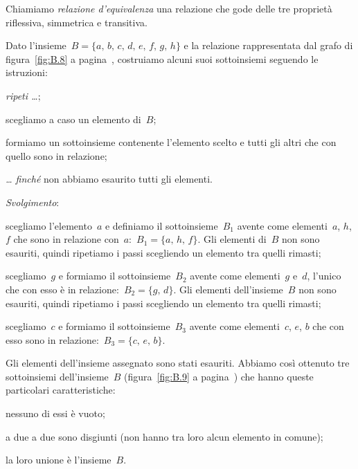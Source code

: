 \begin{definizione}
Chiamiamo \emph{relazione d'equivalenza} una relazione che gode delle tre proprietà riflessiva, simmetrica e transitiva.
\end{definizione}

\ovalbox{\risolvii \ref{ese:B.30}, \ref{ese:B.31}}

\begin{exrig}
 \begin{esempio}

Dato l'insieme~$B = \{a\text{, }b\text{, }c\text{, }d\text{, }e\text{, }f\text{, }g\text{, }h\}$ e la relazione rappresentata dal grafo di figura~\ref{fig:B.8} a pagina~\pageref{fig:B.8}, costruiamo alcuni suoi sottoinsiemi seguendo le istruzioni:
\begin{itemize*}
\item \emph{ripeti \ldots{}};
\item scegliamo a caso un elemento di~$B$;
\item formiamo un sottoinsieme contenente l'elemento scelto e tutti gli altri che con quello sono in relazione;
\item \emph{\ldots{} finché} non abbiamo esaurito tutti gli elementi.
\end{itemize*}


\emph{Svolgimento}:
\begin{itemize*}
\item scegliamo l'elemento~$a$ e definiamo il sottoinsieme~$B_1$ avente come elementi~$a$, $h$, $f$ che sono in relazione con~$a$:~$B_1 = \{a\text{, }h\text{, }f\}$.
Gli elementi di~$B$ non sono esauriti, quindi ripetiamo i passi scegliendo un elemento tra quelli rimasti;
\item scegliamo~$g$ e formiamo il sottoinsieme~$B_2$ avente come elementi~$g$ e~$d$, l'unico che con esso è in relazione:~$B_2 = \{g\text{, }d\}$.
Gli elementi dell'insieme~$B$ non sono esauriti, quindi ripetiamo i passi scegliendo un elemento tra quelli rimasti;
\item scegliamo~$c$ e formiamo il sottoinsieme~$B_3$ avente come elementi~$c$, $e$, $b$ che con esso sono in relazione:~$B_3 = \{c\text{, }e\text{, }b\}$.
\end{itemize*}

Gli elementi dell'insieme assegnato sono stati esauriti. Abbiamo così ottenuto tre sottoinsiemi dell'insieme~$B$ (figura~\ref{fig:B.9} a pagina~\pageref{fig:B.9}) che hanno queste particolari caratteristiche:

\begin{itemize*}
\item nessuno di essi è vuoto;
\item a due a due sono disgiunti (non hanno tra loro alcun elemento in comune);
\item la loro unione è l'insieme~$B$.
\end{itemize*}
 \end{esempio}
\end{exrig}

